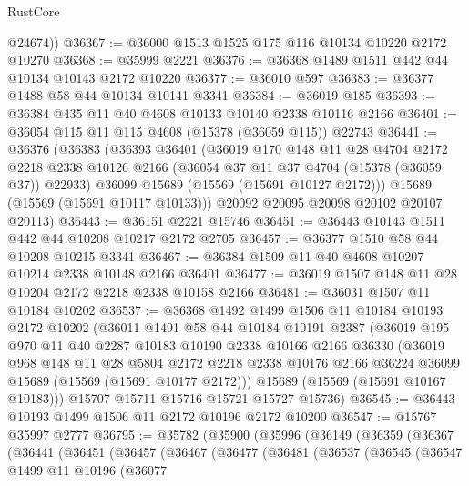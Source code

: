 \begin{lexlean}{RustCore}
\begin{coremodule}
        @24674))
@36367 := @36000 @1513 @1525 @175 @116 @10134 @10220 @2172 @10270
@36368 := @35999 @2221
@36376 := @36368 @1489 @1511 @442 @44 @10134 @10143 @2172 @10220
@36377 := @36010 @597
@36383 := @36377 @1488 @58 @44 @10134 @10141 @3341
@36384 := @36019 @185
@36393 := @36384 @435 @11 @40 @4608 @10133 @10140 @2338 @10116 @2166
@36401 := @36054 @115 @11 @115 @4608 (@15378 (@36059 @115)) @22743
@36441 := @36376
    (@36383
      (@36393
        @36401
        (@36019
          @170
          @148
          @11
          @28
          @4704
          @2172
          @2218
          @2338
          @10126
          @2166
          (@36054 @37 @11 @37 @4704 (@15378 (@36059 @37)) @22933)
          @36099
          @15689
          (@15569 (@15691 @10127 @2172)))
        @15689
        (@15569 (@15691 @10117 @10133)))
      @20092
      @20095
      @20098
      @20102
      @20107
      @20113)
@36443 := @36151 @2221 @15746
@36451 := @36443 @10143 @1511 @442 @44 @10208 @10217 @2172 @2705
@36457 := @36377 @1510 @58 @44 @10208 @10215 @3341
@36467 := @36384 @1509 @11 @40 @4608 @10207 @10214 @2338 @10148 @2166 @36401
@36477 := @36019 @1507 @148 @11 @28 @10204 @2172 @2218 @2338 @10158 @2166
@36481 := @36031 @1507 @11 @10184 @10202
@36537 := @36368
    @1492
    @1499
    @1506
    @11
    @10184
    @10193
    @2172
    @10202
    (@36011
      @1491
      @58
      @44
      @10184
      @10191
      @2387
      (@36019
        @195
        @970
        @11
        @40
        @2287
        @10183
        @10190
        @2338
        @10166
        @2166
        @36330
        (@36019
          @968
          @148
          @11
          @28
          @5804
          @2172
          @2218
          @2338
          @10176
          @2166
          @36224
          @36099
          @15689
          (@15569 (@15691 @10177 @2172)))
        @15689
        (@15569 (@15691 @10167 @10183)))
      @15707
      @15711
      @15716
      @15721
      @15727
      @15736)
@36545 := @36443 @10193 @1499 @1506 @11 @2172 @10196 @2172 @10200
@36547 := @15767 @35997 @2777
@36795 := @35782
    (@35900
      (@35996
        (@36149
          (@36359
            (@36367
              (@36441
                (@36451
                  (@36457
                    (@36467
                      (@36477
                        (@36481
                          (@36537
                            (@36545
                              (@36547
                                @1499
                                @11
                                @10196
                                (@36077

\end{coremodule}
\end{lexlean}
